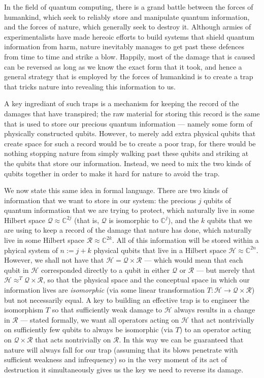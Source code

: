 \documentclass[twocolumn,showpacs,preprintnumbers,amsmath,amssymb,nofootinbib,pra,floatfix]{revtex4}
\begin{document}
In the field of quantum computing, there is a grand battle between the forces of humankind, which seek to reliably store and manipulate quantum information, and the forces of nature, which generally seek to destroy it.  Although armies of experimentalists have made hereoic efforts to build systems that shield quantum information from harm, nature inevitably manages to get past these defences from time to time and strike a blow.  Happily, most of the damage that is caused can be reversed as long as we know the exact form that it took, and hence a general strategy that is employed by the forces of humankind is to create a trap that tricks nature into revealing this information to us.

A key ingrediant of such traps is a mechanism for keeping the record of the damages that have transpired;  the raw material for storing this record is the same that is used to store our precious quantum information --- namely some form of physically constructed qubits.  However, to merely add extra physical qubits that create space for such a record would be to create a poor trap, for there would be nothing stopping nature from simply walking past these qubits and striking at the qubits that store our information.  Instead, we need to mix the two kinds of qubits together in order to make it hard for nature to avoid the trap.

We now state this same idea in formal language.  There are two kinds of information that we want to store in our system:  the precious $j$ qubits of quantum information that we are trying to protect, which naturally live in some Hilbert space $\mathscr{Q}\approx\mathbb{C}^{2j}$ (that is, $\mathscr{Q}$ is isomorphic to $\mathbb{C}^j$), and the $k$ qubits that we are using to keep a record of the damage that nature has done, which naturally live in some Hilbert space $\mathscr{R}\approx\mathbb{C}^{2k}.$  All of this information will be stored within a phyical system of $n:=j+k$ physical qubits that live in a Hilbert space $\mathscr{H}\approx\mathbb{C}^{2n}$.  However, we shall not have that $\mathscr{H}=\mathscr{Q}\times\mathscr{R}$ --- which would mean that each qubit in $\mathscr{H}$ corresponded directly to a qubit in either $\mathscr{Q}$ or $\mathscr{R}$ --- but merely that $\mathscr{H}\approx^T\mathscr{Q}\times\mathscr{R}$, so that the physical space and the conceptual space in which our information lives are \emph{isomorphic} (via some linear transformation $T:\mathscr{H}\to\mathscr{Q}\times\mathscr{R} $) but not necessarily equal.  A key to building an effective trap is to engineer the isomorphism $T$ so that sufficiently weak damage to $\mathscr{H}$ always results in a change in $\mathscr{R}$ --- stated formally, we want all operators acting on $\mathscr{H}$ that act nontrivially on sufficiently few qubits to always be isomorphic (via $T$) to an operator acting on $\mathscr{Q}\times\mathscr{R}$ that acts nontrivially on $\mathscr{R}$.  In this way we can be guaranteed that nature will always fall for our trap (assuming that its blows penetrate with sufficient weakness and infrequency) so in the very moment of its act of destruction it simultaneously gives us the key we need to reverse its damage.
\end{document}

